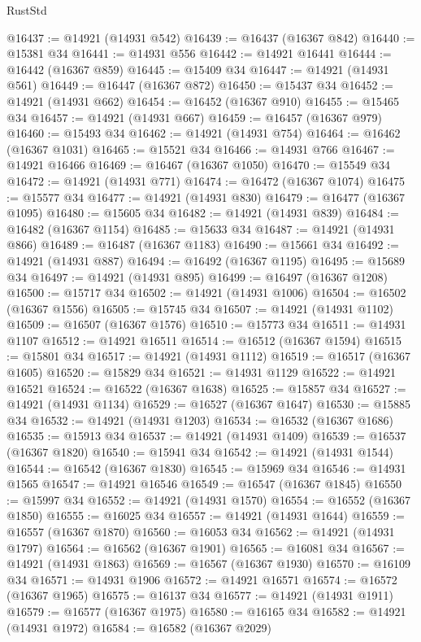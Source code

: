\begin{lexlean}{RustStd}
\begin{coremodule}
@16437 := @14921 (@14931 @542)
@16439 := @16437 (@16367 @842)
@16440 := @15381 @34
@16441 := @14931 @556
@16442 := @14921 @16441
@16444 := @16442 (@16367 @859)
@16445 := @15409 @34
@16447 := @14921 (@14931 @561)
@16449 := @16447 (@16367 @872)
@16450 := @15437 @34
@16452 := @14921 (@14931 @662)
@16454 := @16452 (@16367 @910)
@16455 := @15465 @34
@16457 := @14921 (@14931 @667)
@16459 := @16457 (@16367 @979)
@16460 := @15493 @34
@16462 := @14921 (@14931 @754)
@16464 := @16462 (@16367 @1031)
@16465 := @15521 @34
@16466 := @14931 @766
@16467 := @14921 @16466
@16469 := @16467 (@16367 @1050)
@16470 := @15549 @34
@16472 := @14921 (@14931 @771)
@16474 := @16472 (@16367 @1074)
@16475 := @15577 @34
@16477 := @14921 (@14931 @830)
@16479 := @16477 (@16367 @1095)
@16480 := @15605 @34
@16482 := @14921 (@14931 @839)
@16484 := @16482 (@16367 @1154)
@16485 := @15633 @34
@16487 := @14921 (@14931 @866)
@16489 := @16487 (@16367 @1183)
@16490 := @15661 @34
@16492 := @14921 (@14931 @887)
@16494 := @16492 (@16367 @1195)
@16495 := @15689 @34
@16497 := @14921 (@14931 @895)
@16499 := @16497 (@16367 @1208)
@16500 := @15717 @34
@16502 := @14921 (@14931 @1006)
@16504 := @16502 (@16367 @1556)
@16505 := @15745 @34
@16507 := @14921 (@14931 @1102)
@16509 := @16507 (@16367 @1576)
@16510 := @15773 @34
@16511 := @14931 @1107
@16512 := @14921 @16511
@16514 := @16512 (@16367 @1594)
@16515 := @15801 @34
@16517 := @14921 (@14931 @1112)
@16519 := @16517 (@16367 @1605)
@16520 := @15829 @34
@16521 := @14931 @1129
@16522 := @14921 @16521
@16524 := @16522 (@16367 @1638)
@16525 := @15857 @34
@16527 := @14921 (@14931 @1134)
@16529 := @16527 (@16367 @1647)
@16530 := @15885 @34
@16532 := @14921 (@14931 @1203)
@16534 := @16532 (@16367 @1686)
@16535 := @15913 @34
@16537 := @14921 (@14931 @1409)
@16539 := @16537 (@16367 @1820)
@16540 := @15941 @34
@16542 := @14921 (@14931 @1544)
@16544 := @16542 (@16367 @1830)
@16545 := @15969 @34
@16546 := @14931 @1565
@16547 := @14921 @16546
@16549 := @16547 (@16367 @1845)
@16550 := @15997 @34
@16552 := @14921 (@14931 @1570)
@16554 := @16552 (@16367 @1850)
@16555 := @16025 @34
@16557 := @14921 (@14931 @1644)
@16559 := @16557 (@16367 @1870)
@16560 := @16053 @34
@16562 := @14921 (@14931 @1797)
@16564 := @16562 (@16367 @1901)
@16565 := @16081 @34
@16567 := @14921 (@14931 @1863)
@16569 := @16567 (@16367 @1930)
@16570 := @16109 @34
@16571 := @14931 @1906
@16572 := @14921 @16571
@16574 := @16572 (@16367 @1965)
@16575 := @16137 @34
@16577 := @14921 (@14931 @1911)
@16579 := @16577 (@16367 @1975)
@16580 := @16165 @34
@16582 := @14921 (@14931 @1972)
@16584 := @16582 (@16367 @2029)

\end{coremodule}
\end{lexlean}
